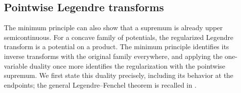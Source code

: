 \subsection{Pointwise Legendre transforms}\label{sec:psh-legendre}

The minimum principle can also show that a supremum is already upper semicontinuous. For a concave family of potentials, the regularized Legendre transform is a potential on a product. The minimum principle identifies its inverse transforms with the original family everywhere, and applying the one-variable duality once more identifies the regularization with the pointwise supremum. We first state this duality precisely, including its behavior at the endpoints; the general Legendre--Fenchel theorem is recalled in \cite[Appendix~A]{SGPT}.

